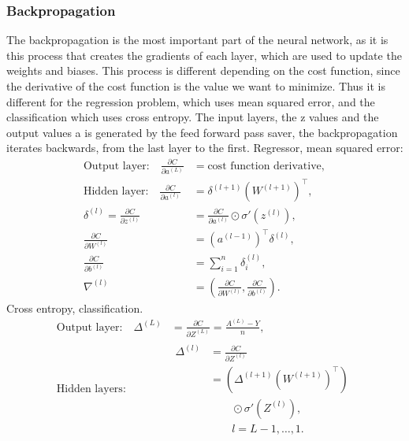 \subsubsection{Backpropagation}
The backpropagation is the most important part of the neural network,
as it is this process that creates the gradients of each layer, which are used
to update the weights and biases. This process is different depending
on the cost function, since the derivative of the cost function 
is the value we want to minimize. Thus it is different for the
regression problem, which uses mean squared error, and the classification
which uses cross entropy. 
The input layers, the z values and the output values a is generated
by the feed forward pass saver, the backpropagation iterates backwards,
from the last layer to the first. 
Regressor, mean squared error:
\begin{align}
    \text{Output layer:}\quad
    \frac{\partial C}{\partial a^{(L)}}
    &= \text{cost function derivative}, \\[4pt]
    \text{Hidden layer:}\quad
    \frac{\partial C}{\partial a^{(l)}}
    &= \delta^{(l+1)} \left(W^{(l+1)}\right)^\top, \\[4pt]
    \delta^{(l)}
    = \frac{\partial C}{\partial z^{(l)}}
    &= \frac{\partial C}{\partial a^{(l)}} \odot
       \sigma'\!\left(z^{(l)}\right), \\[4pt]
    \frac{\partial C}{\partial W^{(l)}}
    &= \left(a^{(l-1)}\right)^\top \delta^{(l)}, \\[4pt]
    \frac{\partial C}{\partial b^{(l)}}
    &= \sum_{i=1}^{n} \delta_i^{(l)}, \\[4pt]
    \nabla^{(l)}
    &= \left(
       \frac{\partial C}{\partial W^{(l)}},
       \frac{\partial C}{\partial b^{(l)}}
       \right).
\end{align}
Cross entropy, classification. 
\begin{align}
    \text{Output layer:}\quad
    \Delta^{(L)}
    &= \frac{\partial C}{\partial Z^{(L)}}
     = \frac{A^{(L)} - Y}{n}, \\[4pt]
    \text{Hidden layers:}\quad
    &
    \begin{aligned}
        \Delta^{(l)}
        &= \frac{\partial C}{\partial Z^{(l)}} \\
        &= \left(\Delta^{(l+1)} (W^{(l+1)})^\top\right) \\
        &\qquad \odot \sigma'\!\left(Z^{(l)}\right), \\
        &\qquad l = L-1,\ldots,1.
    \end{aligned}
\end{align}
